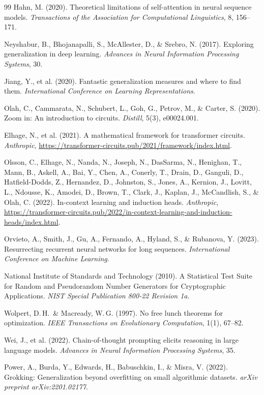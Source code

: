 \documentclass[11pt]{article}
\theoremstyle{plain}
\theoremstyle{definition}
\begin{document}
\begin{thebibliography}{99}
Hahn, M. (2020).
Theoretical limitations of self-attention in neural sequence models.
\textit{Transactions of the Association for Computational Linguistics}, 8, 156--171.

Neyshabur, B., Bhojanapalli, S., McAllester, D., \& Srebro, N. (2017).
Exploring generalization in deep learning.
\textit{Advances in Neural Information Processing Systems}, 30.

Jiang, Y., et al. (2020).
Fantastic generalization measures and where to find them.
\textit{International Conference on Learning Representations}.

Olah, C., Cammarata, N., Schubert, L., Goh, G., Petrov, M., \& Carter, S. (2020).
Zoom in: An introduction to circuits.
\textit{Distill}, 5(3), e00024.001.

Elhage, N., et al. (2021).
A mathematical framework for transformer circuits.
\textit{Anthropic}, \url{https://transformer-circuits.pub/2021/framework/index.html}.

Olsson, C., Elhage, N., Nanda, N., Joseph, N., DasSarma, N., Henighan, T., Mann, B., Askell, A., Bai, Y., Chen, A., Conerly, T., Drain, D., Ganguli, D., Hatfield-Dodds, Z., Hernandez, D., Johnston, S., Jones, A., Kernion, J., Lovitt, L., Ndousse, K., Amodei, D., Brown, T., Clark, J., Kaplan, J., McCandlish, S., \& Olah, C. (2022).
In-context learning and induction heads.
\textit{Anthropic}, \url{https://transformer-circuits.pub/2022/in-context-learning-and-induction-heads/index.html}.

Orvieto, A., Smith, J., Gu, A., Fernando, A., Hyland, S., \& Rubanova, Y. (2023).
Resurrecting recurrent neural networks for long sequences.
\textit{International Conference on Machine Learning}.

National Institute of Standards and Technology (2010).
A Statistical Test Suite for Random and Pseudorandom Number Generators for Cryptographic Applications.
\textit{NIST Special Publication 800-22 Revision 1a}.

Wolpert, D.\,H.\ \& Macready, W.\,G. (1997).
No free lunch theorems for optimization.
\textit{IEEE Transactions on Evolutionary Computation}, 1(1), 67--82.

Wei, J., et al. (2022).
Chain-of-thought prompting elicits reasoning in large language models.
\textit{Advances in Neural Information Processing Systems}, 35.

Power, A., Burda, Y., Edwards, H., Babuschkin, I., \& Misra, V. (2022).
Grokking: Generalization beyond overfitting on small algorithmic datasets.
\textit{arXiv preprint arXiv:2201.02177}.

\end{thebibliography}
\end{document}
